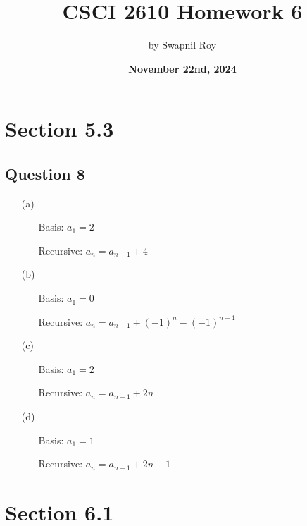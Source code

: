 \documentclass{article}
\title{\textbf{CSCI 2610 Homework 6}}
\date{\textbf{November 22nd, 2024}}
\author{by Swapnil Roy}
\begin{document}
\maketitle
\raggedright

\section*{Section 5.3}
\subsection*{Question 8}
\begin{itemize}
    \item[(a)] 
    \begin{itemize}
        \item[Basis:] $a_1 = 2$
        \item[Recursive:] $a_n = a_{n-1} + 4$
    \end{itemize}
    
    \item[] %
    \item[(b)] 
    \begin{itemize}
        \item[Basis:] $a_1 = 0$
        \item[Recursive:] $a_n = a_{n-1} + (-1)^n - (-1)^{n-1}$
    \end{itemize}
    
    \item[] %
    \item[(c)] 
    \begin{itemize}
        \item[Basis:] $a_1 = 2$
        \item[Recursive:] $a_n = a_{n-1} + 2n$
    \end{itemize}
    
    \item[] %
    \item[(d)] 
    \begin{itemize}
        \item[Basis:] $a_1 = 1$
        \item[Recursive:] $a_n = a_{n-1} + 2n - 1$
    \end{itemize}
\end{itemize}

\section*{Section 6.1}
\end{document}
